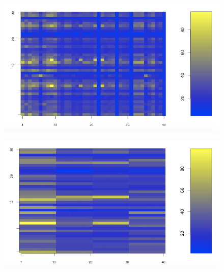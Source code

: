 \begin{figure}
\centering
\begin{minipage}{.5\textwidth}
  \centering
  \includegraphics[width=1\linewidth]{num_pred_mf.png}
  \label{fig:test3}
\end{minipage}%
\begin{minipage}{.5\textwidth}
  \centering
  \includegraphics[width=1\linewidth]{num_pred_mf_crf.png}
  \label{fig:test4}
\end{minipage}
\end{figure}

